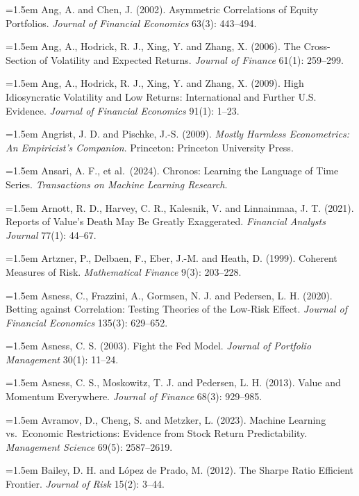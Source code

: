 \hangindent=1.5em Ang, A. and Chen, J. (2002). Asymmetric Correlations of Equity Portfolios. \emph{Journal of Financial Economics} 63(3): 443--494.

\hangindent=1.5em Ang, A., Hodrick, R. J., Xing, Y. and Zhang, X. (2006). The Cross-Section of Volatility and Expected Returns. \emph{Journal of Finance} 61(1): 259--299.

\hangindent=1.5em Ang, A., Hodrick, R. J., Xing, Y. and Zhang, X. (2009). High Idiosyncratic Volatility and Low Returns: International and Further U.S. Evidence. \emph{Journal of Financial Economics} 91(1): 1--23.

\hangindent=1.5em Angrist, J. D. and Pischke, J.-S. (2009). \emph{Mostly Harmless Econometrics: An Empiricist's Companion}. Princeton: Princeton University Press.

\hangindent=1.5em Ansari, A. F., et al.\ (2024). Chronos: Learning the Language of Time Series. \emph{Transactions on Machine Learning Research}.

\hangindent=1.5em Arnott, R. D., Harvey, C. R., Kalesnik, V. and Linnainmaa, J. T. (2021). Reports of Value's Death May Be Greatly Exaggerated. \emph{Financial Analysts Journal} 77(1): 44--67.

\hangindent=1.5em Artzner, P., Delbaen, F., Eber, J.-M. and Heath, D. (1999). Coherent Measures of Risk. \emph{Mathematical Finance} 9(3): 203--228.

\hangindent=1.5em Asness, C., Frazzini, A., Gormsen, N. J. and Pedersen, L. H. (2020). Betting against Correlation: Testing Theories of the Low-Risk Effect. \emph{Journal of Financial Economics} 135(3): 629--652.

\hangindent=1.5em Asness, C. S. (2003). Fight the Fed Model. \emph{Journal of Portfolio Management} 30(1): 11--24.

\hangindent=1.5em Asness, C. S., Moskowitz, T. J. and Pedersen, L. H. (2013). Value and Momentum Everywhere. \emph{Journal of Finance} 68(3): 929--985.

\hangindent=1.5em Avramov, D., Cheng, S. and Metzker, L. (2023). Machine Learning vs.\ Economic Restrictions: Evidence from Stock Return Predictability. \emph{Management Science} 69(5): 2587--2619.

\hangindent=1.5em Bailey, D. H. and L\'opez de Prado, M. (2012). The Sharpe Ratio Efficient Frontier. \emph{Journal of Risk} 15(2): 3--44.

